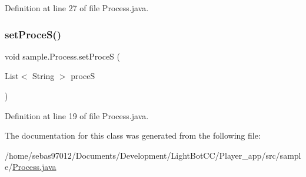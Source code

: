 Definition at line 27 of file Process.\+java.

\mbox{\label{classsample_1_1_process_af5b5fb495b85597be2e1d64969ed41da}} 
\subsubsection{\texorpdfstring{set\+Proce\+S()}{setProceS()}}
{\footnotesize\ttfamily void sample.\+Process.\+set\+ProceS (\begin{DoxyParamCaption}\item[{List$<$ String $>$}]{proceS }\end{DoxyParamCaption})\hspace{0.3cm}{\ttfamily [inline]}}



Definition at line 19 of file Process.\+java.



The documentation for this class was generated from the following file\+:\begin{DoxyCompactItemize}
\item 
/home/sebas97012/\+Documents/\+Development/\+Light\+Bot\+C\+C/\+Player\+\_\+app/src/sample/\mbox{\hyperlink{_process_8java}{Process.\+java}}\end{DoxyCompactItemize}
